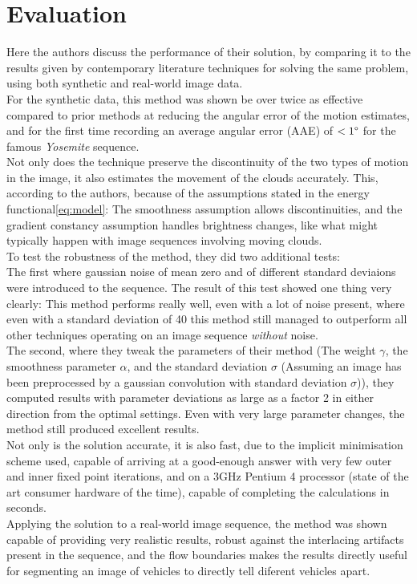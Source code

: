 \documentclass{article}
\begin{document}
\section{Evaluation}
\label{sc:evaluation}
Here the authors discuss the performance of their solution, by comparing it to the results given by contemporary literature techniques for solving the same problem, using both synthetic and real-world image data.\\
For the synthetic data, this method was shown be over twice as effective compared to prior methods at reducing the angular error of the motion estimates, and for the first time recording an average angular error (AAE) of $<1\degree$  for the famous \textit{Yosemite} sequence.\\
Not only does the technique preserve the discontinuity of the two types of motion in the image, it also estimates the movement of the clouds accurately. This, according to the authors, because of the assumptions stated in the energy functional\ref{eq:model}: The smoothness assumption allows discontinuities, and the gradient constancy assumption handles brightness changes, like what might typically happen with image sequences involving moving clouds.\\
To test the robustness of the method, they did two additional tests: \\The first where gaussian noise of mean zero and of different standard deviaions were introduced to the sequence. The result of this test showed one thing very clearly: This method performs really well, even with a lot of noise present, where even with a standard deviation of 40 this method still managed to outperform all other techniques operating on an image sequence \textit{without} noise.\\
The second, where they tweak the parameters of their method (The weight $\gamma$, the smoothness parameter $\alpha$, and the standard deviation $\sigma$ (Assuming an image has been preprocessed by a gaussian convolution with standard deviation $\sigma$)), they computed results with parameter deviations as large as a factor 2 in either direction from the optimal settings. Even with very large parameter changes, the method still produced excellent results.\\
Not only is the solution accurate, it is also fast, due to the implicit minimisation scheme used, capable of arriving at a good-enough answer with very few outer and inner fixed point iterations, and on a 3GHz Pentium 4 processor (state of the art consumer hardware of the time), capable of completing the calculations in seconds.\\
Applying the solution to a real-world image sequence, the method was shown capable of providing very realistic results, robust against the interlacing artifacts present in the sequence, and the flow boundaries makes the results directly useful for segmenting an image of vehicles to directly tell diferent vehicles apart.
\end{document}
